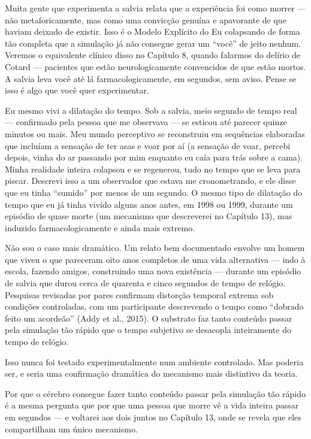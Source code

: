 \documentclass[11pt, twoside, openright]{book}
\begin{document}
Muita gente que experimenta a salvia relata que a experiência foi como morrer --- não metaforicamente, mas como uma convicção genuína e apavorante de que haviam deixado de existir. Isso é o Modelo Explícito do Eu colapsando de forma tão completa que a simulação já não consegue gerar um ``você'' de jeito nenhum. Veremos o equivalente clínico disso no Capítulo 8, quando falarmos do delírio de Cotard --- pacientes que estão neurologicamente convencidos de que estão mortos. A salvia leva você até lá farmacologicamente, em segundos, sem aviso. Pense se isso é algo que você quer experimentar.

Eu mesmo vivi a dilatação do tempo. Sob a salvia, meio segundo de tempo real --- confirmado pela pessoa que me observava --- se esticou até parecer quinze minutos ou mais. Meu mundo perceptivo se reconstruiu em sequências elaboradas que incluíam a sensação de ter asas e voar por aí (a sensação de voar, percebi depois, vinha do ar passando por mim enquanto eu caía para trás sobre a cama). Minha realidade inteira colapsou e se regenerou, tudo no tempo que se leva para piscar. Descrevi isso a um observador que estava me cronometrando, e ele disse que eu tinha ``sumido'' por menos de um segundo. O mesmo tipo de dilatação do tempo que eu já tinha vivido alguns anos antes, em 1998 ou 1999, durante um episódio de quase morte (um mecanismo que descreverei no Capítulo 13), mas induzido farmacologicamente e ainda mais extremo.

Não sou o caso mais dramático. Um relato bem documentado envolve um homem que viveu o que pareceram oito anos completos de uma vida alternativa --- indo à escola, fazendo amigos, construindo uma nova existência --- durante um episódio de salvia que durou cerca de quarenta e cinco segundos de tempo de relógio. Pesquisas revisadas por pares confirmam distorção temporal extrema sob condições controladas, com um participante descrevendo o tempo como ``dobrado feito um acordeão'' (Addy et al., 2015). O substrato faz tanto conteúdo passar pela simulação tão rápido que o tempo subjetivo se desacopla inteiramente do tempo de relógio.

Isso nunca foi testado experimentalmente num ambiente controlado. Mas poderia ser, e seria uma confirmação dramática do mecanismo mais distintivo da teoria.

Por que o cérebro consegue fazer tanto conteúdo passar pela simulação tão rápido é a mesma pergunta que por que uma pessoa que morre vê a vida inteira passar em segundos --- e voltarei aos dois juntos no Capítulo 13, onde se revela que eles compartilham um único mecanismo.
\end{document}
